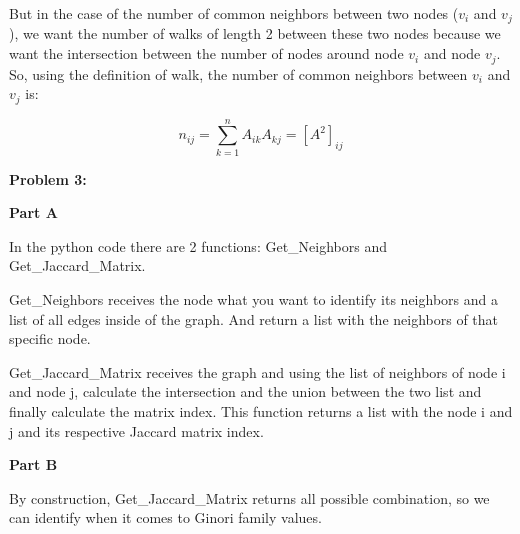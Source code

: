 \documentclass[11pt]{article}
\begin{document}
But in the case of the number of common neighbors between two nodes ($v_i$ and $v_j$), we want the number of walks of length 2 between these two nodes because we want the intersection between the number of nodes around node $v_i$ and node $v_j$. So, using the definition of walk, the number of common neighbors between $v_i$ and $v_j$ is:

\begin{equation*}
    n_{ij} = \sum_{k=1}^{n} A_{ik} A_{kj} = [A^2]_{ij}
\end{equation*}


\clearpage

\textbf{Problem 3:}

\textbf{Part A}

In the python code there are 2 functions: Get\_Neighbors and Get\_Jaccard\_Matrix.

Get\_Neighbors receives the node what you want to identify its neighbors and a list of all edges inside of the graph. And return a list with the neighbors of that specific node.

Get\_Jaccard\_Matrix receives the graph and using the list of neighbors of node i and node j, calculate the intersection and the union between the two list and finally calculate the matrix index. This function returns a list with the node i and j and its respective Jaccard matrix index.


\textbf{Part B}

By construction, Get\_Jaccard\_Matrix returns all possible combination, so we can identify when it comes to Ginori family values.

\clearpage
\end{document}
